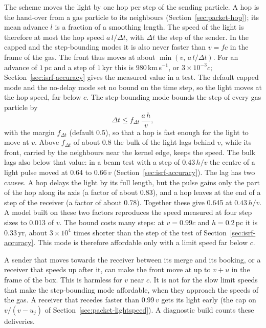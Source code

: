 The scheme moves the light by one hop per step of the sending particle. A hop
is the hand-over from a gas particle to its neighbours
(Section~\ref{sec:packet-hop}); its mean advance $l$ is a fraction of a
smoothing length. The speed of the light is therefore at most the hop speed
$a\,l/\Delta t$, with $\Delta t$ the step of the sender. In the capped and the
step-bounding modes it is also never faster than $v=fc$ in the frame of the
gas. The front thus moves at about $\min(v,\,a\,l/\Delta t)$. For an advance of
$1$\,pc and a step of $1$\,kyr this is $980$\,km\,s$^{-1}$, or
$3\times10^{-3}c$; Section~\ref{sec:isrf-accuracy} gives the measured value in
a test. The default capped mode and the no-delay mode set no bound on the time
step, so the light moves at the hop speed, far below $c$. The step-bounding
mode bounds the step of every gas particle by
\begin{equation}
  \Delta t \le f_{\Delta t}\,\frac{a\,h}{v},
  \label{eq:isrf-dt}
\end{equation}
with the margin $f_{\Delta t}$ (default 0.5), so that a hop is fast enough for
the light to move at $v$. Above $f_{\Delta t}$ of about 0.8 the bulk of the
light lags behind $v$, while its front, carried by the neighbours near the
kernel edge, keeps the speed. The bulk lags also below that value: in a beam
test with a step of $0.43\,h/v$ the centre of a light pulse moved at 0.64 to
$0.66\,v$ (Section~\ref{sec:isrf-accuracy}). The lag has two causes. A hop delays the light by its full length, but the
pulse gains only the part of the hop along its axis (a factor of about 0.83),
and a hop leaves at the end of a step of the receiver (a factor of about 0.78).
Together these give 0.645 at $0.43\,h/v$. A model built on these two factors
reproduces the speed measured at four step sizes to 0.013 of $v$. The bound costs many steps: at $v=0.99c$ and $h=0.2$\,pc it is $0.33$\,yr,
about $3\times10^4$ times shorter than the step of the test of
Section~\ref{sec:isrf-accuracy}. This mode is therefore affordable only with a
limit speed far below $c$.

A sender that moves towards the receiver between its merge and its booking, or
a receiver that speeds up after it, can make the front move at up to $v+u$ in
the frame of the box. This is harmless for $v$ near $c$. It is not for the slow
limit speeds that make the step-bounding mode affordable, when they approach
the speeds of the gas. A receiver that recedes
faster than $0.99\,v$ gets its light early (the cap on $v/(v-u_j)$ of
Section~\ref{sec:packet-lightspeed}). A diagnostic build counts these
deliveries.

